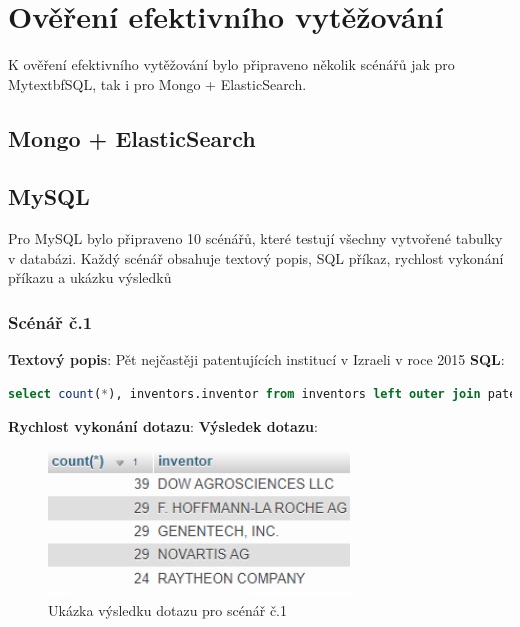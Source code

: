 
\chapter{Ověření efektivního vytěžování}
K ověření efektivního vytěžování bylo připraveno několik scénářů jak pro Mytextbf{SQL}, tak i pro Mongo + ElasticSearch.
\section{Mongo + ElasticSearch}
\section{MySQL}
Pro MySQL bylo připraveno 10 scénářů, které testují všechny vytvořené tabulky v databázi. Každý scénář obsahuje textový popis, SQL příkaz, rychlost vykonání příkazu a ukázku výsledků

\subsection{Scénář č.1}
\textbf{Textový popis}: Pět nejčastěji patentujících institucí v Izraeli v roce 2015
\newline
\textbf{SQL}: 
\begin{lstlisting}[language=SQL, breaklines=true, frame=single, label = {lst:elements_a}, captionpos=b]
select count(*), inventors.inventor from inventors left outer join patents on inventors.id_patent = patents.id where YEAR(patents.patent_date) = 2015 and patents.patent_id like '%IL%' group by inventors.inventor order by count(*) desc LIMIT 5;
\end{lstlisting}
\textbf{Rychlost vykonání dotazu}: 
\newline
\textbf{Výsledek dotazu}:
\begin{figure}[h!]
\centering
\includegraphics[width=8cm]{img/scenare/scenar_1}
\caption{Ukázka výsledku dotazu pro scénář č.1}
\label{fig:scenar1}
\end{figure}


